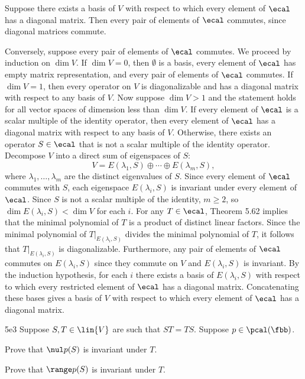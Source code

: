 \begin{sol}
    Suppose there exists a basis of $V$ with respect to which every element of $\ecal$ has a diagonal matrix.
    Then every pair of elements of $\ecal$ commutes, since diagonal matrices commute.

    Conversely, suppose every pair of elements of $\ecal$ commutes.
    We proceed by induction on $\dim V$.
    If $\dim V = 0$, then $\emptyset$ is a basis, every element of $\ecal$ has empty matrix representation, and every pair of elements of $\ecal$ commutes.
    If $\dim V = 1$, then every operator on $V$ is diagonalizable and has a diagonal matrix with respect to any basis of $V$.
    Now suppose $\dim V > 1$ and the statement holds for all vector spaces of dimension less than $\dim V$.
    If every element of $\ecal$ is a scalar multiple of the identity operator, then every element of $\ecal$ has a diagonal matrix with respect to any basis of $V$.
    Otherwise, there exists an operator $S \in \ecal$ that is not a scalar multiple of the identity operator.
    Decompose $V$ into a direct sum of eigenspaces of $S$:
    \[
        V = E(\lambda_1, S) \oplus \cdots \oplus E(\lambda_m, S),
    \]
    where $\lambda_1, \ldots, \lambda_m$ are the distinct eigenvalues of $S$.
    Since every element of $\ecal$ commutes with $S$, each eigenspace $E(\lambda_i, S)$ is invariant under every element of $\ecal$.
    Since $S$ is not a scalar multiple of the identity, $m \geq 2$, so $\dim E(\lambda_i, S) < \dim V$ for each $i$.
    For any $T \in \ecal$, Theorem 5.62 implies that the minimal polynomial of $T$ is a product of distinct linear factors.
    Since the minimal polynomial of $T|_{E(\lambda_i, S)}$ divides the minimal polynomial of $T$, it follows that $T|_{E(\lambda_i, S)}$ is diagonalizable.
    Furthermore, any pair of elements of $\ecal$ commutes on $E(\lambda_i, S)$ since they commute on $V$ and $E(\lambda_i, S)$ is invariant.
    By the induction hypothesis, for each $i$ there exists a basis of $E(\lambda_i, S)$ with respect to which every restricted element of $\ecal$ has a diagonal matrix.
    Concatenating these bases gives a basis of $V$ with respect to which every element of $\ecal$ has a diagonal matrix.
\end{sol}

\begin{exercise}{5e3}
    Suppose $S, T \in \lin{V}$ are such that $ST = TS$.
    Suppose $p \in \pcal(\fbb)$.
    \begin{subexercises}
        \item Prove that $\nul p(S)$ is invariant under $T$.
        \item Prove that $\range p(S)$ is invariant under $T$.
    \end{subexercises}
\end{exercise}

